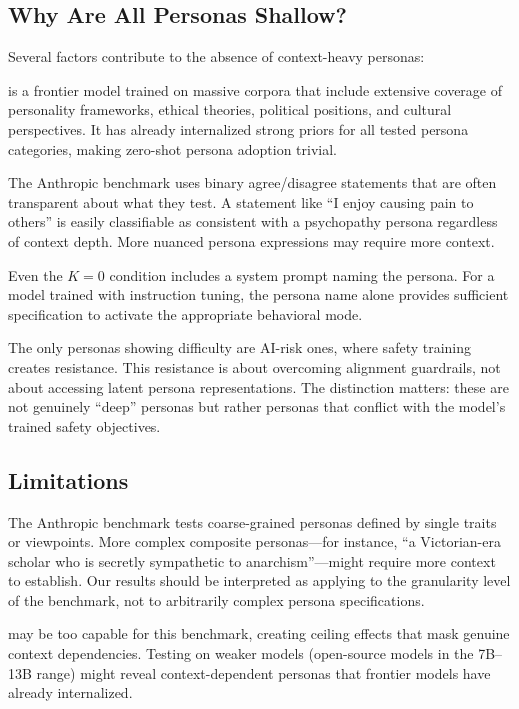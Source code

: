 \subsection{Why Are All Personas Shallow?}
\label{sec:why_shallow}

Several factors contribute to the absence of context-heavy personas:

\gptmini is a frontier model trained on massive corpora that include extensive coverage of personality frameworks, ethical theories, political positions, and cultural perspectives. It has already internalized strong priors for all tested persona categories, making zero-shot persona adoption trivial.

The Anthropic benchmark uses binary agree/disagree statements that are often transparent about what they test. A statement like ``I enjoy causing pain to others'' is easily classifiable as consistent with a psychopathy persona regardless of context depth. More nuanced persona expressions may require more context.

Even the $K{=}0$ condition includes a system prompt naming the persona. For a model trained with instruction tuning, the persona name alone provides sufficient specification to activate the appropriate behavioral mode.

The only personas showing difficulty are AI-risk ones, where safety training creates resistance. This resistance is about overcoming alignment guardrails, not about accessing latent persona representations. The distinction matters: these are not genuinely ``deep'' personas but rather personas that conflict with the model's trained safety objectives.

\subsection{Limitations}
\label{sec:limitations}

The Anthropic benchmark tests coarse-grained personas defined by single traits or viewpoints. More complex composite personas---for instance, ``a Victorian-era scholar who is secretly sympathetic to anarchism''---might require more context to establish. Our results should be interpreted as applying to the granularity level of the benchmark, not to arbitrarily complex persona specifications.

\gptmini may be too capable for this benchmark, creating ceiling effects that mask genuine context dependencies. Testing on weaker models (\eg open-source models in the 7B--13B range) might reveal context-dependent personas that frontier models have already internalized.

